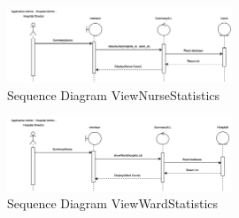     \begin{figure}[h]
    \centering
    \includegraphics[width=0.6\textwidth]{Sequence 11.6.png}
    \caption{Sequence Diagram ViewNurseStatistics}
    \end{figure}

    \begin{figure}[h]
    \centering
    \includegraphics[width=0.6\textwidth]{Sequence 11.7.png}
    \caption{Sequence Diagram ViewWardStatistics}
    \end{figure}

